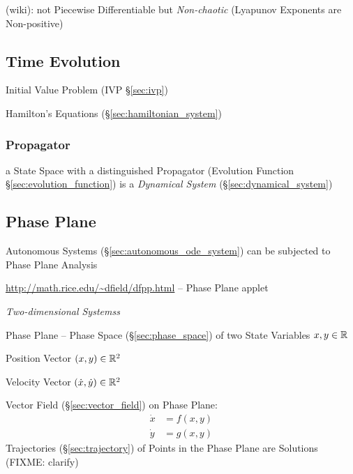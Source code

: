 (wiki): not Piecewise Differentiable but \emph{Non-chaotic} (Lyapunov Exponents
are Non-positive)




\subsection{Time Evolution}\label{sec:time_evolution}

\fist Initial Value Problem (IVP \S\ref{sec:ivp})

Hamilton's Equations (\S\ref{sec:hamiltonian_system})



\subsubsection{Propagator}\label{sec:propagator}

a State Space with a distinguished Propagator (Evolution Function
\S\ref{sec:evolution_function}) is a \emph{Dynamical System}
(\S\ref{sec:dynamical_system})



\subsection{Phase Plane}\label{sec:phase_plane}


Autonomous Systems (\S\ref{sec:autonomous_ode_system}) can be subjected to Phase
Plane Analysis

\url{http://math.rice.edu/~dfield/dfpp.html} -- Phase Plane applet

\emph{Two-dimensional Systemss}

Phase Plane -- Phase Space (\S\ref{sec:phase_space}) of two State Variables
$x,y \in \mathbb{R}$

Position Vector $(x,y) \in \mathbb{R}^2$

Velocity Vector $(\dot{x},\dot{y}) \in \mathbb{R}^2$

Vector Field (\S\ref{sec:vector_field}) on Phase Plane:
\begin{align*}
  \dot{x} & = f(x,y) \\
  \dot{y} & = g(x,y)
\end{align*}
Trajectories (\S\ref{sec:trajectory}) of Points in the Phase Plane are
Solutions (FIXME: clarify)

